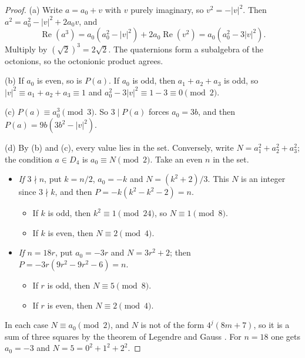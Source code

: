 \begin{proof}
(a) Write $a=a_0+v$ with $v$ purely imaginary, so $v^2=-|v|^2$. Then $a^2=a_0^2-|v|^2+2a_0v$, and
\[
\operatorname{Re}(a^3)=a_0(a_0^2-|v|^2)+2a_0\operatorname{Re}(v^2)=a_0(a_0^2-3|v|^2).
\]
Multiply by $(\sqrt2)^3=2\sqrt2$. The quaternions form a subalgebra of the octonions, so the octonionic product agrees.

(b) If $a_0$ is even, so is $P(a)$. If $a_0$ is odd, then $a_1+a_2+a_3$ is odd, so $|v|^2\equiv a_1+a_2+a_3\equiv1$ and $a_0^2-3|v|^2\equiv1-3\equiv0\pmod2$.

(c) $P(a)\equiv a_0^3\pmod3$. So $3\mid P(a)$ forces $a_0=3b$, and then $P(a)=9b(3b^2-|v|^2)$.

(d) By (b) and (c), every value lies in the set. Conversely, write $N=a_1^2+a_2^2+a_3^2$; the condition $a\in D_4$ is $a_0\equiv N\pmod2$. Take an even $n$ in the set.
\begin{itemize}
\item \emph{If $3\nmid n$}, put $k=n/2$, $a_0=-k$ and $N=(k^2+2)/3$. This $N$ is an integer since $3\nmid k$, and then $P=-k(k^2-k^2-2)=n$.
\begin{itemize}
\item If $k$ is odd, then $k^2\equiv1\pmod{24}$, so $N\equiv1\pmod8$.
\item If $k$ is even, then $N\equiv2\pmod4$.
\end{itemize}
\item \emph{If $n=18r$}, put $a_0=-3r$ and $N=3r^2+2$; then $P=-3r(9r^2-9r^2-6)=n$.
\begin{itemize}
\item If $r$ is odd, then $N\equiv5\pmod8$.
\item If $r$ is even, then $N\equiv2\pmod4$.
\end{itemize}
\end{itemize}
In each case $N\equiv a_0\pmod2$, and $N$ is not of the form $4^j(8m+7)$, so it is a sum of three squares by the theorem of Legendre and Gauss \cite[Ch.~IV, Appendix]{Ser73}. For $n=18$ one gets $a_0=-3$ and $N=5=0^2+1^2+2^2$.
\end{proof}

